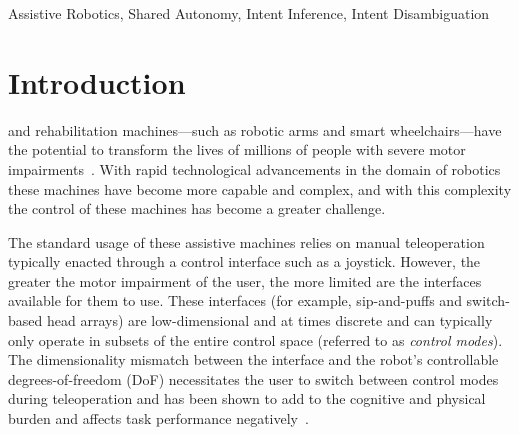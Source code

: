 \documentclass[journal]{IEEEtran}
\begin{document}
\begin{IEEEkeywords}
Assistive Robotics, Shared Autonomy, Intent Inference, Intent Disambiguation
\end{IEEEkeywords}



%
\IEEEpeerreviewmaketitle

\section{Introduction}
 and rehabilitation machines---such as robotic arms and smart wheelchairs---have the potential to transform the lives of millions of people with severe motor impairments~\cite{laplante1992assistive}. With rapid technological advancements in the domain of robotics these machines have become more capable and complex, and with this complexity the control of these machines has become a greater challenge. 

The standard usage of these assistive machines relies on manual teleoperation typically enacted through a control interface such as a joystick. However, the greater the motor impairment of the user, the more limited are the interfaces available for them to use. These interfaces (for example, sip-and-puffs and switch-based head arrays) are low-dimensional and at times discrete and can typically only operate in subsets of the entire control space (referred to as \textit{control modes}). The dimensionality mismatch between the interface and the robot's controllable degrees-of-freedom (DoF) necessitates the user to switch between control modes during teleoperation and has been shown to add to the cognitive and physical burden and affects task performance negatively~\cite{herlant2016assistive}.
\end{document}
